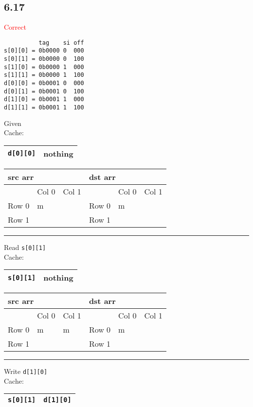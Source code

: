 \clearpage
\subsection*{6.17}
\textcolor{red}{Correct}
\begin{verbatim}
          tag    si off
s[0][0] = 0b0000 0  000
s[0][1] = 0b0000 0  100
s[1][0] = 0b0000 1  000
s[1][1] = 0b0000 1  100
d[0][0] = 0b0001 0  000
d[0][1] = 0b0001 0  100
d[1][0] = 0b0001 1  000
d[1][1] = 0b0001 1  100
\end{verbatim}

\noindent
Given\\
Cache:
\begin{tabular}{|l|l|}
\hline
\verb+d[0][0]+ & nothing \\ \hline
\end{tabular}


\noindent
\begin{tabular}{llllll}
\multicolumn{3}{l}{src arr} & \multicolumn{3}{l}{dst arr} \\ \hline
        & Col 0   & Col 1   &         & Col 0   & Col 1   \\ \hline
Row 0   & m       &         & Row 0   & m       &         \\
Row 1   &         &         & Row 1   &         &        
\end{tabular}

\noindent
\rule{\textwidth}{1pt}
Read \verb+s[0][1]+\\
Cache:
\begin{tabular}{|l|l|}
\hline
\verb+s[0][1]+ & nothing \\ \hline
\end{tabular}


\noindent
\begin{tabular}{llllll}
\multicolumn{3}{l}{src arr} & \multicolumn{3}{l}{dst arr} \\ \hline
        & Col 0   & Col 1   &         & Col 0   & Col 1   \\ \hline
Row 0   & m       & m       & Row 0   & m       &         \\
Row 1   &         &         & Row 1   &         &        
\end{tabular}

\noindent
\rule{\textwidth}{1pt}
Write \verb+d[1][0]+\\
Cache:
\begin{tabular}{|l|l|}
\hline
\verb+s[0][1]+ & \verb+d[1][0]+ \\ \hline
\end{tabular}


